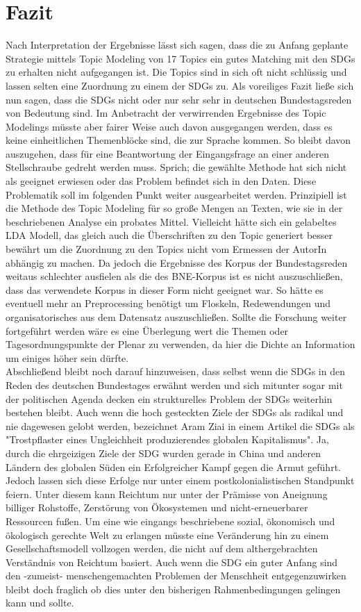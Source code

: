 \documentclass[letterpaper]{article}
\begin{document}
\section{Fazit}
Nach Interpretation der Ergebnisse lässt sich sagen, dass die zu Anfang geplante Strategie mittels Topic Modeling von 17 Topics ein gutes Matching mit den SDGs zu erhalten nicht aufgegangen ist. Die Topics sind in sich oft nicht schlüssig und lassen selten eine Zuordnung zu einem der SDGs zu. Als voreiliges Fazit ließe sich nun sagen, dass die SDGs nicht oder nur sehr sehr in deutschen Bundestagsreden von Bedeutung sind. Im Anbetracht der verwirrenden Ergebnisse des Topic Modelings müsste aber fairer Weise auch davon ausgegangen werden, dass es keine einheitlichen Themenblöcke sind, die zur Sprache kommen. So bleibt davon auszugehen, dass für eine Beantwortung der Eingangsfrage an einer anderen Stellschraube gedreht werden muss. Sprich; die gewählte Methode hat sich nicht als geeignet erwiesen oder das Problem befindet sich in den Daten. Diese Problematik soll im folgenden Punkt weiter ausgearbeitet werden. 
Prinzipiell ist die Methode des Topic Modeling für so große Mengen an Texten, wie sie in der beschriebenen Analyse ein probates Mittel. Vielleicht hätte sich ein gelabeltes LDA Modell, das gleich auch die Überschriften zu den Topic generiert besser bewährt um die Zuordnung zu den Topics nicht vom Ermessen der AutorIn abhängig zu machen. Da jedoch die Ergebnisse des Korpus der Bundestagsreden weitaus schlechter ausfielen als die des BNE-Korpus ist es nicht auszuschließen, dass das verwendete Korpus in dieser Form nicht geeignet war. So hätte es eventuell mehr an Preprocessing benötigt um Floskeln, Redewendungen und organisatorisches aus dem Datensatz auszuschließen. Sollte die Forschung weiter fortgeführt werden wäre es eine Überlegung wert die Themen oder Tagesordnungspunkte der Plenar zu verwenden, da hier die Dichte an Information um einiges höher sein dürfte.\\
Abschließend bleibt noch darauf hinzuweisen, dass selbst wenn die SDGs in den Reden des deutschen Bundestages erwähnt werden und sich mitunter sogar mit der politischen Agenda decken ein strukturelles Problem der SDGs weiterhin bestehen bleibt. Auch wenn die hoch gesteckten Ziele der SDGs als radikal und nie dagewesen gelobt werden, bezeichnet Aram Ziai in einem Artikel die SDGs als "Trostpflaster eines Ungleichheit produzierendes globalen Kapitalismus". Ja, durch die ehrgeizigen Ziele der SDG wurden gerade in China und anderen Ländern des globalen Süden ein Erfolgreicher Kampf gegen die Armut geführt. Jedoch lassen sich diese Erfolge nur unter einem postkolonialistischen Standpunkt feiern. Unter diesem kann Reichtum nur unter der Prämisse von Aneignung billiger Rohstoffe, Zerstörung von Ökosystemen und nicht-erneuerbarer Ressourcen fußen. Um eine wie eingangs beschriebene sozial, ökonomisch und ökologisch gerechte Welt zu erlangen müsste eine Veränderung hin zu einem Gesellschaftsmodell vollzogen werden, die nicht auf dem althergebrachten Verständnis von Reichtum basiert\cite{Ziai}. Auch wenn die SDG ein guter Anfang sind den -zumeist- menschengemachten Problemen der Menschheit entgegenzuwirken bleibt doch fraglich ob dies unter den bisherigen Rahmenbedingungen gelingen kann und sollte.
\end{document}
